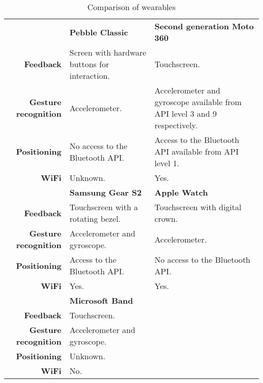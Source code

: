 \renewcommand{\arraystretch}{1.2}
\begin{table}[!htb]
\centering
\caption{Comparison of wearables}
\label{tbl:analysis:choice-of-wearable}
\begin{tabularx}{\linewidth}{rXX}
\multicolumn{1}{l}{\textbf{}}     & \textbf{Pebble Classic}                       & \textbf{Second generation Moto 360} \\
\textbf{Feedback} & Screen with hardware buttons for interaction. & Touchscreen.                        \\
\textbf{Gesture recognition}      & Accelerometer. \cite{pebble:accelerometer}                                & Accelerometer and gyroscope available from API level 3 and 9 respectively. \cite{motorola:moto360, android:creating-wearable-apps, android:motion-sensors, android:sensors-overview}        \\
\textbf{Positioning}              & No access to the Bluetooth API.               & Access to the Bluetooth API available from API level 1. \cite{motorola:moto360, android:creating-wearable-apps, android:Bluetooth, android:broadcast-receiver}        \\
\textbf{WiFi}                     & Unknown.    & Yes.                                \\
\multicolumn{1}{l}{}              & \textbf{Samsung Gear S2}                      & \textbf{Apple Watch}                \\
\textbf{Feedback} & Touchscreen with a rotating bezel.             & Touchscreen with digital crown.     \\
\textbf{Gesture recognition}      & Accelerometer and gyroscope. \cite{samsung:gears2, tizen:sensors}                  & Accelerometer.                      \\
\textbf{Positioning}              & Access to the Bluetooth API. \cite{samsung:gears2, tizen:Bluetooth}                  & No access to the Bluetooth API.     \\
\textbf{WiFi}                     & Yes.                                          & Yes.                               \\
\multicolumn{1}{l}{}              & \textbf{Microsoft Band}                      & ~                \\
\textbf{Feedback} & Touchscreen.            & ~     \\
\textbf{Gesture recognition}      & Accelerometer and gyroscope. \cite{microsoft:band-sdk, microsoft:band-sdk-documentation}                  & ~                      \\
\textbf{Positioning}              & Unknown.                  & ~     \\
\textbf{WiFi}                     & No.                                          & ~                               
\end{tabularx}
\end{table}

